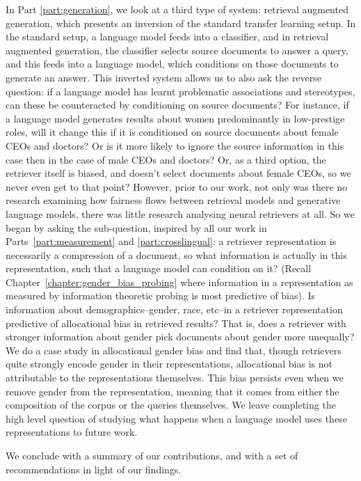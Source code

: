 In Part \ref{part:generation}, we look at a third type of system: retrieval augmented generation, which presents an inversion of the standard transfer learning setup. In the standard setup,  a language model feeds into a classifier, and in retrieval augmented generation, the classifier selects source documents to answer a query, and this feeds into a language model, which conditions on those documents to generate an answer. This inverted system allows us to also ask the reverse question: if a language model has learnt problematic associations and stereotypes, can these be counteracted by conditioning on source documents? For instance, if a language model generates results about women predominantly in low-prestige roles, will it change this if it is conditioned on source documents about female CEOs and doctors? Or is it more likely to ignore the source information in this case then in the case of male CEOs and doctors? Or, as a third option, the retriever itself is biased, and doesn't select documents about female CEOs, so we never even get to that point?
However, prior to our work, not only was there no research examining how fairness flows between retrieval models and generative language models, there was little research analysing neural retrievers at all. So we began by asking the sub-question, inspired by all our work in Parts~\ref{part:measurement} and \ref{part:crosslingual}: a retriever representation is necessarily a compression of a document, so what information is actually in this representation, such that 
 a language model can condition on it? (Recall Chapter~\ref{chapter:gender_bias_probing} where information in a representation as measured by information theoretic probing is most predictive of bias). Is information about demographics--gender, race, etc--in a retriever representation predictive of allocational bias in retrieved results? That is, does a retriever with stronger information about gender pick documents about gender more unequally? We do a case study in allocational gender bias and find that, though retrievers quite strongly encode gender in their representations, allocational bias is not attributable to the representations themselves. This bias persists even when we remove gender from the representation, meaning that it comes from either the composition of the corpus or the queries themselves. We leave completing the high level question of studying what happens when a language model uses these representations to future work. 

 We conclude with a summary of our contributions, and with a set of recommendations in light of our findings.

